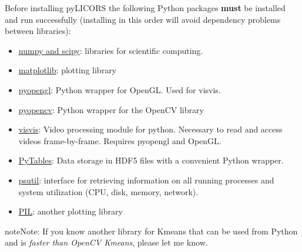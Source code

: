 \documentclass[letterpaper,10pt,english]{sphinxmanual}
\begin{document}
Before installing pyLICORS the following Python packages \textbf{must} be installed and run successfully
(installing in this order will avoid dependency problems between libraries):
\begin{itemize}
\item {} 
\href{http://numpy.scipy.org/}{numpy and scipy}: libraries for scientific computing.

\item {} 
\href{http://matplotlib.sourceforge.net/}{matplotlib}: plotting library

\item {} 
\href{http://pyopengl.sourceforge.net/}{pyopengl}: Python wrapper for OpenGL. Used for visvis.

\item {} 
\href{https://code.google.com/p/pyopencv/}{pyopencv}: Python wrapper for the OpenCV library

\item {} 
\href{https://code.google.com/p/visvis/}{visvis}: Video processing module for python.
Necessary to read and access videos frame-by-frame. Requires pyopengl and OpenGL.

\item {} 
\href{http://www.pytables.org/moin}{PyTables}: Data storage in HDF5 files with a convenient Python wrapper.

\item {} 
\href{https://code.google.com/p/psutil/}{psutil}: interface for retrieving information on all running processes and system utilization (CPU, disk, memory, network).

\item {} 
\href{http://www.pythonware.com/products/pil/}{PIL}: another plotting library

\end{itemize}

\begin{notice}{note}{Note:}
If you know another library for Kmeans that can be used from Python and is \emph{faster than OpenCV Kmeans}, please let me know.
\end{notice}
\end{document}

